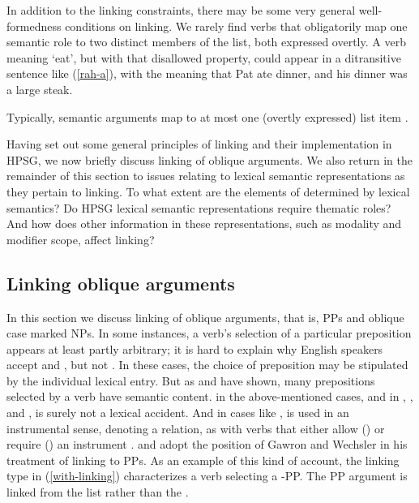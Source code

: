 \documentclass[output=paper
                ,modfonts
                ,nonflat
	        ,collection
	        ,collectionchapter
	        ,collectiontoclongg
 	        ,biblatex
                ,babelshorthands
                ,newtxmath
                ,draftmode
                ,colorlinks, citecolor=brown
]{./langsci/langscibook}
\begin{document}
In addition to the linking constraints, there may be some very general well-formedness conditions on linking.  We rarely find verbs that obligatorily map one semantic role to two distinct members of the \argst list, both expressed overtly.  A verb meaning `eat', but with that disallowed property, could appear in a ditransitive sentence like (\ref{rah-a}), with the meaning that Pat ate dinner, and his dinner was a large steak.  

\begin{exe}
\end{exe}

\noindent
Typically, semantic arguments map to at most one (overtly expressed) \argst list item \citep[262--268]{Davis2001}.

Having set out some general principles of linking and their implementation in HPSG, we now briefly discuss linking of oblique arguments.
We also return in the remainder of this section to issues relating to lexical semantic representations as they pertain to linking.
To what extent are the elements of \argst determined by lexical semantics?
Do HPSG lexical semantic representations require thematic roles?
And how does other information in these representations, such as modality and modifier scope, affect linking?

\subsection{Linking oblique arguments}
In this section we discuss linking of oblique arguments, that is, PPs and oblique case marked NPs.
In some instances, a verb's selection of a particular preposition appears at least partly arbitrary;
it is hard to explain why English speakers accept  and , but  not .
In these cases, the choice of preposition may be stipulated by the individual lexical entry.
But as \citet{Gawron1986} and \citet{Wechsler1995} have shown, many prepositions selected by a verb have semantic content.
 in the above-mentioned cases, and in , , and , is surely not a lexical accident.
And in  cases like ,  is used in an instrumental sense, denoting a  relation, as with verbs that either allow () or require () an instrument \citep{KoenigandDavis2006}.
\citet{Davis1996} and \citet{Davis2001} adopt the position of Gawron and Wechsler in his treatment of linking to PPs.
As an example of this kind of account, the linking type in (\ref{with-linking}) characterizes a verb selecting a -PP. 
The PP argument is linked from the \rels list  rather than the . 
\end{document}
